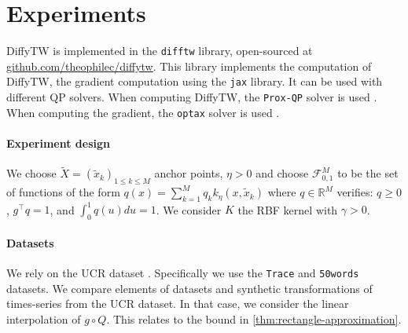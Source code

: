 \section{Experiments}
DiffyTW is implemented in the \texttt{difftw} library, open-sourced at \url{github.com/theophilec/diffytw}. This library implements the computation of DiffyTW, the gradient computation using the \texttt{jax} library. It can be used with different QP solvers. When computing DiffyTW, the \texttt{Prox-QP} solver is used \cite{fabian}. When computing the gradient, the \texttt{optax} solver is used \cite{optax}.




\paragraph{Experiment design}
We choose $\tilde X = (\tilde x_k)_{1\leq k \leq M}$ anchor points, $\eta >0$ and choose $\mathcal F_{0,1}^M$ to be the set of functions of the form $q(x) = \sum_{k=1}^Mq_k k_\eta(x, \tilde x_k)$ where $q\in\mathbb R^M$ verifies: $q \geq 0$, $g^\top q =1$, and $\int_0^1 q(u)du =1$.
We consider $K$ the RBF kernel with $\gamma> 0$.

\paragraph{Datasets} We rely on the UCR dataset \citep{ucr}. Specifically we use the \texttt{Trace} and \texttt{50words} datasets. We compare elements of datasets and synthetic transformations of times-series from the UCR dataset. In that case, we consider the linear interpolation of $g \circ Q$. This relates to the bound in \cref{thm:rectangle-approximation}.

